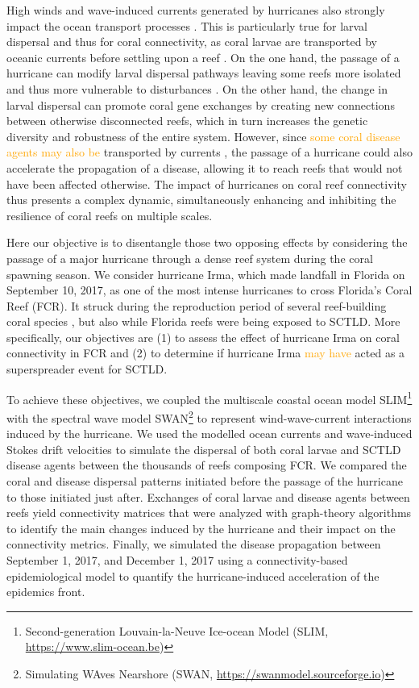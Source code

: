 \documentclass[fleqn,10pt]{wlscirep}
\newcommand{\modif}[1]{\textcolor{orange}{#1}}
\begin{document}
High winds and wave-induced currents generated by hurricanes also strongly impact the ocean transport processes \citep{DobbyIrma,Oey2007May,liu2020impacts}. This is particularly true for larval dispersal and thus for coral connectivity, as coral larvae are transported by oceanic currents before settling upon a reef \citep{Shulman1995Oct}. On the one hand, the passage of a hurricane can modify larval dispersal pathways leaving some reefs more isolated and thus more vulnerable to disturbances \citep{grimaldi2022hydrodynamic}. On the other hand, the change in larval dispersal can promote coral gene exchanges by creating new connections between otherwise disconnected reefs, which in turn increases the genetic diversity and robustness of the entire system. However, since \modif{some coral disease agents may also be} transported by currents \citep{DobbySCTLD}, the passage of a hurricane could also accelerate the propagation of a disease, allowing it to reach reefs that would not have been affected otherwise. The impact of hurricanes on coral reef connectivity thus presents a complex dynamic, simultaneously enhancing and inhibiting the resilience of coral reefs on multiple scales.

Here our objective is to disentangle those two opposing effects by considering the passage of a major hurricane through a dense reef system during the coral spawning season. We consider hurricane Irma, which made landfall in Florida on September 10, 2017, as one of the most intense hurricanes to cross Florida's Coral Reef (FCR). It struck during the reproduction period of several reef-building coral species \citep{quicklook2020}, but also while Florida reefs were being exposed to SCTLD. More specifically, our objectives are (1) to assess the effect of hurricane Irma on coral connectivity in FCR and (2) to determine if hurricane Irma \modif{may have} acted as a superspreader event for SCTLD.

To achieve these objectives, we coupled the multiscale coastal ocean model SLIM\footnote{Second-generation Louvain-la-Neuve Ice-ocean Model (SLIM, \href{https://www.slim-ocean.be}{https://www.slim-ocean.be})} \citep{Lambrechts2008,Frys2020} with the spectral wave model SWAN\footnote{Simulating WAves Nearshore (SWAN, \href{https://swanmodel.sourceforge.io}{https://swanmodel.sourceforge.io})} \citep{Booij1999Apr,DobbyIrma} to represent wind-wave-current interactions induced by the hurricane. We used the modelled ocean currents and wave-induced Stokes drift velocities to simulate the dispersal of both coral larvae and SCTLD disease agents between the thousands of reefs composing FCR. We compared the coral and disease dispersal patterns initiated before the passage of the hurricane to those initiated just after. Exchanges of coral larvae and disease agents between reefs yield connectivity matrices that were analyzed with graph-theory algorithms to identify the main changes induced by the hurricane and their impact on the connectivity metrics. Finally, we simulated the disease propagation between September 1, 2017, and December 1, 2017 using a connectivity-based epidemiological model \citep{DobbySCTLD} to quantify the hurricane-induced acceleration of the epidemics front.
\end{document}
